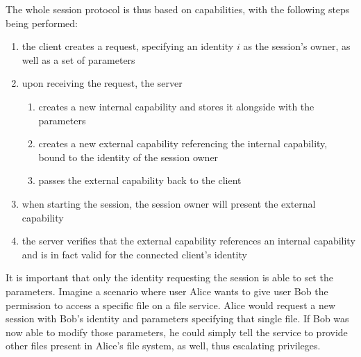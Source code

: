 The whole session protocol is thus based on capabilities, with the following steps being performed:
\begin{enumerate}
    \item the client creates a request, specifying an identity $i$ as the session's owner, as well as a set of parameters
    \item upon receiving the request, the server
        \begin{enumerate}
            \item creates a new internal capability and stores it alongside with the parameters
            \item creates a new external capability referencing the internal capability, bound to the identity of the session owner
            \item passes the external capability back to the client
        \end{enumerate}
    \item when starting the session, the session owner will present the external capability
    \item the server verifies that the external capability references an internal capability and is in fact valid for the connected client's identity
\end{enumerate}

It is important that only the identity requesting the session is able to set the parameters.
Imagine a scenario where user Alice wants to give user Bob the permission to access a specific file on a file service.
Alice would request a new session with Bob's identity and parameters specifying that single file.
If Bob was now able to modify those parameters, he could simply tell the service to provide other files present in Alice's file system, as well, thus escalating privileges.

